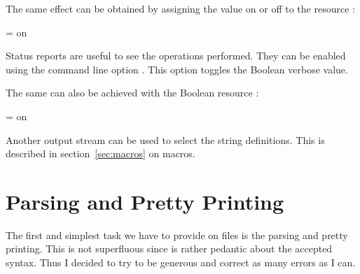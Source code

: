 \documentclass[11pt,a4paper]{scrbook}
\begin{document}
\sh[q]{}

The same effect can be obtained by assigning the value \textsf{on} or
\textsf{off} to the resource :

\begin{Resources}
   = on
\end{Resources}

Status reports are useful to see the operations performed. They can be enabled
using the command line option . This option toggles the Boolean verbose
value.

\sh[v]{}

The same can also be achieved with the Boolean resource :

\begin{Resources}
   = on
\end{Resources}

Another output stream can be used to select the string definitions. This is
described in section~\ref{sec:macros} on macros.


\begin{Summary}
\end{Summary}


\section{Parsing and Pretty Printing}\label{sec:parse.pretty}

The first and simplest task we have to provide on \BibTeX{} files is the
parsing and pretty printing. This is not superfluous since \BibTeX{} is rather
pedantic about the accepted syntax. Thus I decided to try to be generous and
correct as many errors as I can.
\end{document}

